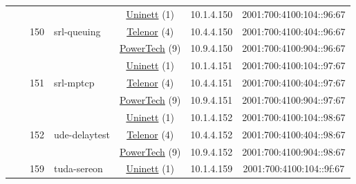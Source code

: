 \begin{small}
\begin{center}
\begin{longtable}{|c|c|c|c|c|c|c|c|}
  &  & \multirow{3}{*}{\tiny{150}} & \multicolumn{1}{|l|}{\multirow{3}{*}{\tiny{srl-queuing}}} & \multicolumn{2}{|c|}{\tiny{\href{https://www.uninett.no}{Uninett} (1)}} & \tiny{10.1.4.150} & \tiny{2001:700:4100:104::96:67} \\* \cline{5-5}\cline{6-6}\cline{7-7}\cline{8-8}
  &  &  &  & \multicolumn{2}{|c|}{\tiny{\href{https://www.telenor.no}{Telenor} (4)}} & \tiny{10.4.4.150} & \tiny{2001:700:4100:404::96:67} \\* \cline{5-5}\cline{6-6}\cline{7-7}\cline{8-8}
  &  &  &  & \multicolumn{2}{|c|}{\tiny{\href{http://www.powertech.no}{PowerTech} (9)}} & \tiny{10.9.4.150} & \tiny{2001:700:4100:904::96:67} \\* \cline{3-3}\cline{4-4}\cline{5-5}\cline{6-6}\cline{7-7}\cline{8-8}
  &  & \multirow{3}{*}{\tiny{151}} & \multicolumn{1}{|l|}{\multirow{3}{*}{\tiny{srl-mptcp}}} & \multicolumn{2}{|c|}{\tiny{\href{https://www.uninett.no}{Uninett} (1)}} & \tiny{10.1.4.151} & \tiny{2001:700:4100:104::97:67} \\* \cline{5-5}\cline{6-6}\cline{7-7}\cline{8-8}
  &  &  &  & \multicolumn{2}{|c|}{\tiny{\href{https://www.telenor.no}{Telenor} (4)}} & \tiny{10.4.4.151} & \tiny{2001:700:4100:404::97:67} \\* \cline{5-5}\cline{6-6}\cline{7-7}\cline{8-8}
  &  &  &  & \multicolumn{2}{|c|}{\tiny{\href{http://www.powertech.no}{PowerTech} (9)}} & \tiny{10.9.4.151} & \tiny{2001:700:4100:904::97:67} \\* \cline{3-3}\cline{4-4}\cline{5-5}\cline{6-6}\cline{7-7}\cline{8-8}
  &  & \multirow{3}{*}{\tiny{152}} & \multicolumn{1}{|l|}{\multirow{3}{*}{\tiny{ude-delaytest}}} & \multicolumn{2}{|c|}{\tiny{\href{https://www.uninett.no}{Uninett} (1)}} & \tiny{10.1.4.152} & \tiny{2001:700:4100:104::98:67} \\* \cline{5-5}\cline{6-6}\cline{7-7}\cline{8-8}
  &  &  &  & \multicolumn{2}{|c|}{\tiny{\href{https://www.telenor.no}{Telenor} (4)}} & \tiny{10.4.4.152} & \tiny{2001:700:4100:404::98:67} \\* \cline{5-5}\cline{6-6}\cline{7-7}\cline{8-8}
  &  &  &  & \multicolumn{2}{|c|}{\tiny{\href{http://www.powertech.no}{PowerTech} (9)}} & \tiny{10.9.4.152} & \tiny{2001:700:4100:904::98:67} \\* \cline{3-3}\cline{4-4}\cline{5-5}\cline{6-6}\cline{7-7}\cline{8-8}
  &  & \multirow{3}{*}{\tiny{159}} & \multicolumn{1}{|l|}{\multirow{3}{*}{\tiny{tuda-sereon}}} & \multicolumn{2}{|c|}{\tiny{\href{https://www.uninett.no}{Uninett} (1)}} & \tiny{10.1.4.159} & \tiny{2001:700:4100:104::9f:67} \\* \cline{5-5}\cline{6-6}\cline{7-7}\cline{8-8}

\end{longtable}
\end{center}
\end{small}
